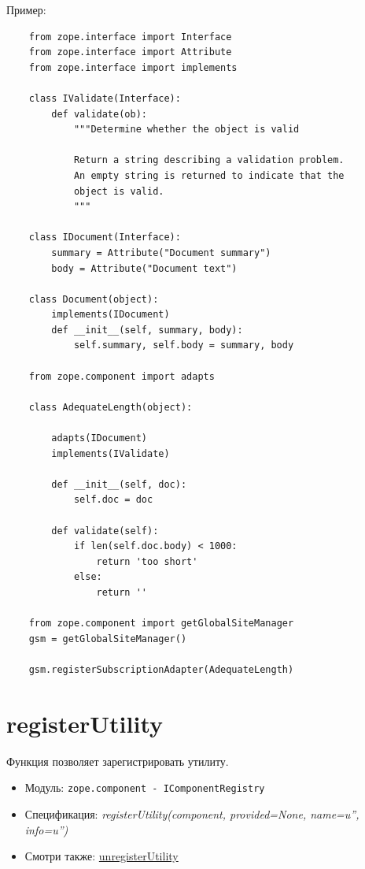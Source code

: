 \documentclass[a4paper,openany,twoside,draft]{book}
\providecommand*{\DUroletitlereference}[1]{\textsl{#1}}
\begin{document}
Пример:

\begin{verbatim}
    from zope.interface import Interface
    from zope.interface import Attribute
    from zope.interface import implements

    class IValidate(Interface):
        def validate(ob):
            """Determine whether the object is valid

            Return a string describing a validation problem.
            An empty string is returned to indicate that the
            object is valid.
            """

    class IDocument(Interface):
        summary = Attribute("Document summary")
        body = Attribute("Document text")

    class Document(object):
        implements(IDocument)
        def __init__(self, summary, body):
            self.summary, self.body = summary, body

    from zope.component import adapts

    class AdequateLength(object):

        adapts(IDocument)
        implements(IValidate)

        def __init__(self, doc):
            self.doc = doc

        def validate(self):
            if len(self.doc.body) < 1000:
                return 'too short'
            else:
                return ''

    from zope.component import getGlobalSiteManager
    gsm = getGlobalSiteManager()

    gsm.registerSubscriptionAdapter(AdequateLength)
\end{verbatim}


\section*{registerUtility%
  \label{registerutility}%
}

Функция позволяет зарегистрировать утилиту.

\begin{itemize}

\item Модуль: \texttt{zope.component - IComponentRegistry}

\item Спецификация: \DUroletitlereference{registerUtility(component, provided=None, name=u'', info=u'')}

\item Смотри также: \hyperref[unregisterutility]{unregisterUtility}

\end{itemize}
\end{document}
